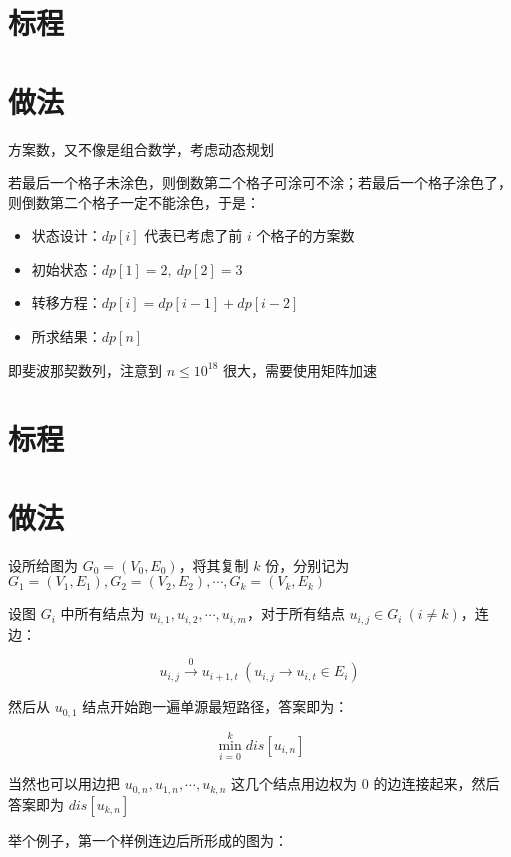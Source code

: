 \documentclass{../cpct/ctsol}
\begin{document}
\section*{标程}


\makesolution
\section*{做法}

方案数，又不像是组合数学，考虑动态规划

若最后一个格子未涂色，则倒数第二个格子可涂可不涂；若最后一个格子涂色了，则倒数第二个格子一定不能涂色，于是：

\begin{itemize}
    \item 状态设计：$dp[i]$ 代表已考虑了前 $i$ 个格子的方案数
    \item 初始状态：$dp[1] = 2,~dp[2] = 3$
    \item 转移方程：$dp[i] = dp[i-1] + dp[i-2]$
    \item 所求结果：$dp[n]$
\end{itemize}

即斐波那契数列，注意到 $n \leq {10}^{18}$ 很大，需要使用矩阵加速

\section*{标程}


\makesolution
\section*{做法}

设所给图为 $G_0=(V_0,E_0)$，将其复制 $k$ 份，分别记为 $G_1=(V_1,E_1),G_2=(V_2,E_2),\cdots,G_k=(V_k,E_k)$

设图 $G_i$ 中所有结点为 $u_{i,1},u_{i,2},\cdots,u_{i,m}$，对于所有结点 $u_{i,j} \in G_i~(i \neq k)$，连边：

$$u_{i,j} \xrightarrow{0} u_{i+1,t}~(u_{i,j} \rightarrow u_{i,t} \in E_i)$$

然后从 $u_{0,1}$ 结点开始跑一遍单源最短路径，答案即为：

$$\min\limits_{i=0}^{k}dis[u_{i,n}]$$

当然也可以用边把 $u_{0,n},u_{1,n},\cdots,u_{k,n}$ 这几个结点用边权为 $0$ 的边连接起来，然后答案即为 $dis[u_{k,n}]$

举个例子，第一个样例连边后所形成的图为：
\end{document}
